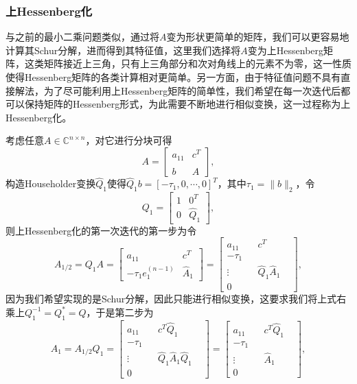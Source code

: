 \documentclass[a4paper,10pt]{ctexart}
\begin{document}
\subsubsection{上Hessenberg化}
与之前的最小二乘问题类似，通过将$ A $变为形状更简单的矩阵，我们可以更容易地计算其Schur分解，进而得到其特征值，这里我们选择将$ A $变为上Hessenberg矩阵，这类矩阵接近上三角，只有上三角部分和次对角线上的元素不为零，这一性质使得Hessenberg矩阵的各类计算相对更简单。另一方面，由于特征值问题不具有直接解法，为了尽可能利用上Hessenberg矩阵的简单性，我们希望在每一次迭代后都可以保持矩阵的Hessenberg形式，为此需要不断地进行相似变换，这一过程称为上Hessenberg化。

考虑任意$ A\in \mathbb{C}^{n\times n} $，对它进行分块可得
\[
    A = 
    \begin{bmatrix} 
        a_{11} & c^T \\
        b & \hat{A}
    \end{bmatrix},
\]
构造Householder变换$ \hat{Q}_1 $使得$ \hat{Q}_1 b = [-\tau_1,0,\cdots ,0]^T $，其中$ \tau_1 = \| b \|_2 $，令
\[
    Q_1 = 
    \begin{bmatrix} 
        1 & 0^T \\
        0 & \hat{Q}_1
    \end{bmatrix},
\]
则上Hessenberg化的第一次迭代的第一步为令
\[
    A_{1 / 2} = Q_1 A =
    \begin{bmatrix} 
        a_{11} & c^T \\
        -\tau_1 e_1^{(n-1)} & \hat{A}_1
    \end{bmatrix} = 
    \left[\begin{array}{c|ccc}
        a_{11} & & c^T &\\ \hline
        -\tau_1 & & & \\
        \vdots & & \hat{Q}_1\hat{A}_1 &\\
        0 & & &
    \end{array}\right],
\]
因为我们希望实现的是Schur分解，因此只能进行相似变换，这要求我们将上式右乘上$ Q_1^{-1} = Q_1^* = Q $，于是第二步为
\[
    A_1 = A_{1 / 2}Q_1 = 
    \left[\begin{array}{c|ccc}
        a_{11} & & c^T \hat{Q}_1 &\\ \hline
        -\tau_1 & & & \\
        \vdots & & \hat{Q}_1\hat{A}_1 \hat{Q}_1 &\\
        0 & & &
    \end{array}\right] = 
    \left[\begin{array}{c|ccc}
        a_{11} & & c^T \hat{Q}_1 &\\ \hline
        -\tau_1 & & & \\
        \vdots & & \hat{A}_1 &\\
        0 & & &
    \end{array}\right],
\]
\end{document}
